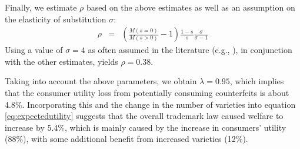 \documentclass[12pt]{article}
\begin{document}
Finally, we estimate $\rho$ based on the above estimates as well as an assumption on the elasticity of substitution $\sigma$:
\begin{eqnarray}
\rho   & = & \left( \frac{M(s=0)}{M(s>0)} - 1  \right) \frac{1-s}{s} \frac{\sigma}{\sigma-1} 
\end{eqnarray}
Using a value of $\sigma = 4$ as often assumed in the literature (e.g., \citealp{Bernardetal2003}), in conjunction with the other estimates, yields $\rho = 0.38$.

Taking into account the above parameters, we obtain $\lambda = 0.95$, which implies that the consumer utility loss from potentially consuming counterfeits is about 4.8\%. Incorporating this and the change in the number of varieties into equation \eqref{eq:expectedutility} suggests that the overall trademark law caused welfare to increase by 5.4\%, which is mainly caused by the increase in consumers' utility (88\%), with some additional benefit from increased varieties (12\%).
\end{document}

